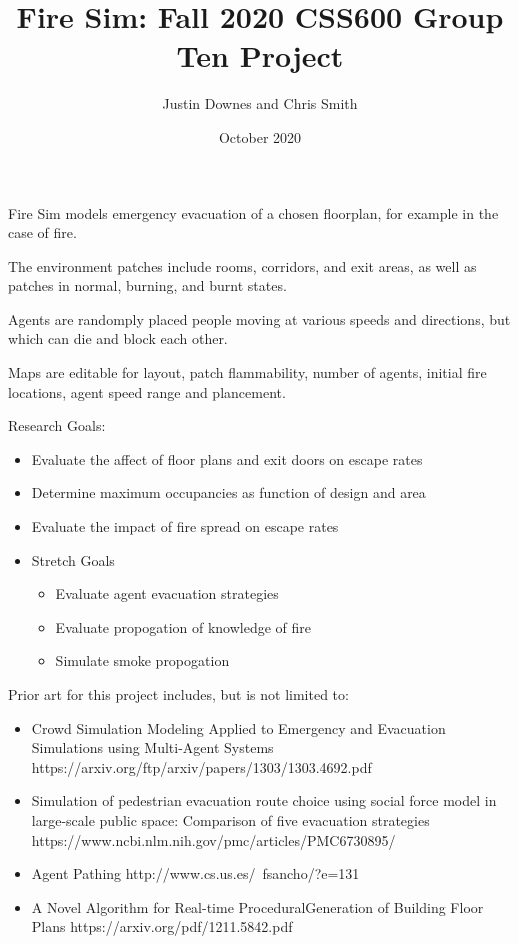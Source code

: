 \documentclass[12pt,letterpaper]{article}
\begin{document}
\title{\vspace{-3cm}Fire Sim: Fall 2020 CSS600 Group Ten Project}
\author{Justin Downes and Chris Smith}
\date{October 2020}
\maketitle


Fire Sim models emergency evacuation of a chosen floorplan, for example in the case of fire.

The environment patches include rooms, corridors, and exit areas, as well as patches in normal, burning, and burnt states.

Agents are randomply placed people moving at various speeds and directions, but which can die and block each other.

Maps are editable for layout, patch flammability, number of agents, initial fire locations, agent speed range and plancement.

Research Goals:

\begin{itemize}
\item Evaluate the affect of floor plans and exit doors on escape rates
\item Determine maximum occupancies as function of design and area
\item Evaluate the impact of fire spread on escape rates
\item Stretch Goals
\begin{itemize}
\item Evaluate agent evacuation strategies
\item Evaluate propogation of knowledge of fire
\item Simulate smoke propogation
\end{itemize}
\end{itemize}


Prior art for this project includes, but is not limited to:
\begin{itemize}
\item Crowd Simulation Modeling Applied to Emergency and Evacuation Simulations using Multi-Agent Systems https://arxiv.org/ftp/arxiv/papers/1303/1303.4692.pdf
\item Simulation of pedestrian evacuation route choice using social force model in large-scale public space: Comparison of five evacuation strategies https://www.ncbi.nlm.nih.gov/pmc/articles/PMC6730895/
\item Agent Pathing http://www.cs.us.es/~fsancho/?e=131
\item A Novel Algorithm for Real-time ProceduralGeneration of Building Floor Plans https://arxiv.org/pdf/1211.5842.pdf
\end{itemize}
\end{document}
